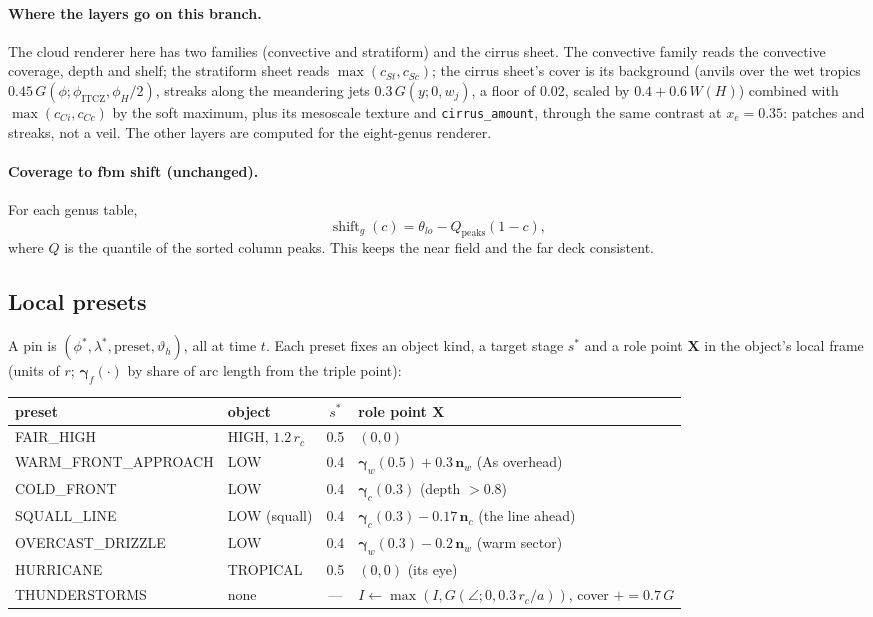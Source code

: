 \documentclass[11pt,a4paper]{article}
\begin{document}
\paragraph{Where the layers go on this branch.} The cloud renderer here has two families
(convective and stratiform) and the cirrus sheet. The convective family reads the convective
coverage, depth and shelf; the stratiform sheet reads $\max(c_{St},c_{Sc})$; the cirrus sheet's
cover is its background (anvils over the wet tropics $0.45\,G(\phi;\phi_{\mathrm{ITCZ}},\phi_H/2)$,
streaks along the meandering jets $0.3\,G(y;0,w_j)$, a floor of 0.02, scaled by
$0.4+0.6\,W(H)$) combined with $\max(c_{Ci},c_{Cc})$ by the soft maximum, plus its
mesoscale texture and \texttt{cirrus\_amount}, through the same contrast at
$x_e=0.35$: patches and streaks, not a veil. The other layers are computed for the eight-genus renderer.

\paragraph{Coverage to fbm shift (unchanged).} For each genus table,
\begin{equation}
  \operatorname{shift}_g(c)=\theta_{lo}-Q_{\mathrm{peaks}}(1-c),
\end{equation}
where $Q$ is the quantile of the sorted column peaks. This keeps the near field and the far
deck consistent.

\subsection{Local presets}
\label{sec:eq-pins}
A pin is $(\phi^*,\lambda^*,\text{preset},\vartheta_h)$, all at time $t$. Each preset fixes an
object kind, a target stage $s^*$ and a role point $\mathbf{X}$ in the object's local frame
(units of $r$; $\boldsymbol\gamma_f(\cdot)$ by share of arc length from the triple point):

\begin{center}
\small
\begin{tabular}{llcp{6.3cm}}
\toprule
preset & object & $s^*$ & role point $\mathbf{X}$\\
\midrule
FAIR\_HIGH & HIGH, $1.2\,r_c$ & 0.5 & $(0,0)$\\
WARM\_FRONT\_APPROACH & LOW & 0.4 & $\boldsymbol\gamma_w(0.5)+0.3\,\mathbf{n}_w$ (As overhead)\\
COLD\_FRONT & LOW & 0.4 & $\boldsymbol\gamma_c(0.3)$ (depth $>0.8$)\\
SQUALL\_LINE & LOW (squall) & 0.4 & $\boldsymbol\gamma_c(0.3)-0.17\,\mathbf{n}_c$ (the line ahead)\\
OVERCAST\_DRIZZLE & LOW & 0.4 & $\boldsymbol\gamma_w(0.3)-0.2\,\mathbf{n}_w$ (warm sector)\\
HURRICANE & TROPICAL & 0.5 & $(0,0)$ (its eye)\\
THUNDERSTORMS & none & --- & $I\leftarrow\max(I,G(\angle;0,0.3\,r_c/a))$, cover $\mathrel{+}=0.7\,G$\\
\bottomrule
\end{tabular}
\end{center}
\end{document}
